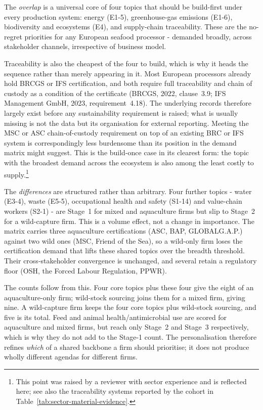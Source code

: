 The \emph{overlap} is a universal core of four topics that should be build-first under
every production system: energy (E1-5), greenhouse-gas emissions (E1-6),
biodiversity and ecosystems (E4), and supply-chain traceability. These are the
no-regret priorities for any European seafood processor - demanded broadly,
across stakeholder channels, irrespective of business model.

Traceability is also the cheapest of the four to build, which is why it heads the
sequence rather than merely appearing in it. Most European processors already
hold BRCGS or IFS certification, and both require full traceability and chain of
custody as a condition of the certificate (BRCGS, 2022, clause~3.9; IFS
Management GmbH, 2023, requirement~4.18). The underlying records therefore
largely exist before any sustainability requirement is raised; what is usually
missing is not the data but its organisation for external reporting. Meeting the
MSC or ASC chain-of-custody requirement on top of an existing BRC or IFS system
is correspondingly less burdensome than its position in the demand matrix might
suggest. This is the build-once case in its clearest form: the topic with the
broadest demand across the ecosystem is also among the least costly to
supply.\footnote{This point was raised by a reviewer with sector experience and
is reflected here; see also the traceability systems reported by the cohort in
Table~\ref{tab:sector-material-evidence}.}

The \emph{differences} are structured rather than arbitrary. Four further
topics - water (E3-4), waste (E5-5), occupational health and safety (S1-14) and
value-chain workers (S2-1) - are Stage~1 for mixed and aquaculture firms but slip
to Stage~2 for a wild-capture firm. This is a volume effect, not a change in
importance. The matrix carries three aquaculture certifications (ASC, BAP,
GLOBALG.A.P.) against two wild ones (MSC, Friend of the Sea), so a wild-only firm
loses the certification demand that lifts these shared topics over the breadth
threshold. Their cross-stakeholder convergence is unchanged, and several retain a
regulatory floor (OSH, the Forced Labour Regulation, PPWR).

The counts follow from this. Four core topics plus these four give the eight of an
aquaculture-only firm; wild-stock sourcing joins them for a mixed firm, giving
nine. A wild-capture firm keeps the four core topics plus wild-stock sourcing, and
five is its total. Feed and animal health/antimicrobial use are scored for
aquaculture and mixed firms, but reach only Stage~2 and Stage~3 respectively,
which is why they do not add to the Stage-1 count. The personalisation therefore refines \emph{which} of a shared backbone
a firm should prioritise; it does not produce wholly different agendas for
different firms.

